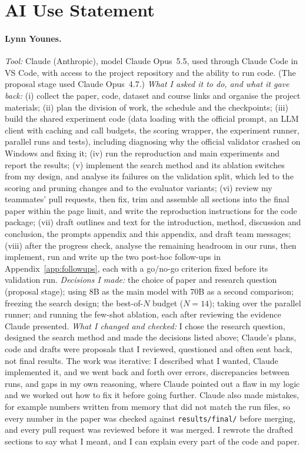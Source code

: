 \section{AI Use Statement}
\label{app:ai-use}

\paragraph{Lynn Younes.}
\emph{Tool:} Claude (Anthropic), model Claude Opus~5.5, used through Claude Code in VS Code, with
access to the project repository and the ability to run code. (The proposal stage used Claude
Opus~4.7.)
\emph{What I asked it to do, and what it gave back:}
(i) collect the paper, code, dataset and course links and organise the project materials;
(ii) plan the division of work, the schedule and the checkpoints;
(iii) build the shared experiment code (data loading with the official prompt, an LLM client with
caching and call budgets, the scoring wrapper, the experiment runner, parallel runs and tests),
including diagnosing why the official validator crashed on Windows and fixing it;
(iv) run the reproduction and main experiments and report the results;
(v) implement the search method and its ablation switches from my design, and analyse its failures
on the validation split, which led to the scoring and pruning changes and to the evaluator variants;
(vi) review my teammates' pull requests, then fix, trim and assemble all sections into the final
paper within the page limit, and write the reproduction instructions for the code package;
(vii) draft outlines and text for the introduction, method, discussion and conclusion, the
prompts appendix and this appendix, and draft team messages;
(viii) after the progress check, analyse the remaining headroom in our runs, then implement, run
and write up the two post-hoc follow-ups in Appendix~\ref{app:followups}, each with a go/no-go
criterion fixed before its validation run.
\emph{Decisions I made:} the choice of paper and research question (proposal stage); using 8B as
the main model with 70B as a second comparison; freezing the search design; the best-of-$N$ budget
($N=14$); taking over the parallel runner; and running the few-shot ablation, each after reviewing
the evidence Claude presented.
\emph{What I changed and checked:} I chose the research question, designed the search method and
made the decisions listed above; Claude's plans, code and drafts were proposals that I reviewed,
questioned and often sent back, not final results. The work was iterative: I described what I
wanted, Claude implemented it, and we went back and forth over errors, discrepancies between runs,
and gaps in my own reasoning, where Claude pointed out a flaw in my logic and we worked out how to
fix it before going further. Claude also made mistakes, for example numbers written from memory that
did not match the run files, so every number in the paper was checked against
\texttt{results/final/} before merging, and every pull request was reviewed before it was merged. I
rewrote the drafted sections to say what I meant, and I can explain every part of the code and
paper.

